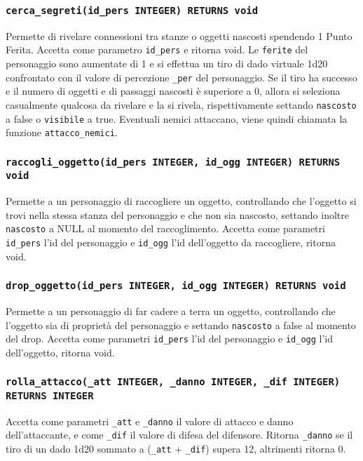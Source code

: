 \documentclass[10pt,a4paper]{article}
\begin{document}
\subsubsection{\texttt{cerca\_segreti(id\_pers INTEGER) RETURNS void}}
Permette di rivelare connessioni tra stanze o oggetti nascosti spendendo 1 Punto Ferita. Accetta come parametro \texttt{id\_pers} e ritorna void. Le \texttt{ferite} del personaggio sono aumentate di 1 e si effettua un tiro di dado virtuale 1d20 confrontato con il valore di percezione \texttt{\_per} del personaggio. Se il tiro ha successo e il numero di oggetti e di passaggi nascosti è superiore a 0, allora si seleziona casualmente qualcosa da rivelare e la si rivela, rispettivamente settando \texttt{nascosto} a false o \texttt{visibile} a true. Eventuali nemici attaccano, viene quindi chiamata la funzione \texttt{attacco\_nemici}.

\subsubsection{\texttt{raccogli\_oggetto(id\_pers INTEGER, id\_ogg INTEGER) RETURNS void}}
Permette a un personaggio di raccogliere un oggetto, controllando che l'oggetto si trovi nella stessa stanza del personaggio e che non sia nascosto, settando inoltre \texttt{nascosto} a NULL al momento del raccoglimento. Accetta come parametri \texttt{id\_pers} l'id del personaggio e \texttt{id\_ogg} l'id dell'oggetto da raccogliere, ritorna void.

\subsubsection{\texttt{drop\_oggetto(id\_pers INTEGER, id\_ogg INTEGER) RETURNS void}}
Permette a un personaggio di far cadere a terra un oggetto, controllando che l'oggetto sia di proprietà del personaggio e settando \texttt{nascosto} a false al momento del drop. Accetta come parametri \texttt{id\_pers} l'id del personaggio e \texttt{id\_ogg} l'id dell'oggetto, ritorna void.

\subsubsection{\texttt{rolla\_attacco(\_att INTEGER, \_danno INTEGER, \_dif INTEGER) RETURNS INTEGER}}
Accetta come parametri \texttt{\_att} e \texttt{\_danno} il valore di attacco e danno dell'attaccante, e come \texttt{\_dif} il valore di difesa del difensore. Ritorna  \texttt{\_danno} se il tiro di un dado 1d20 sommato a (\texttt{\_att} + \texttt{\_dif}) supera 12, altrimenti ritorna 0.
\end{document}
